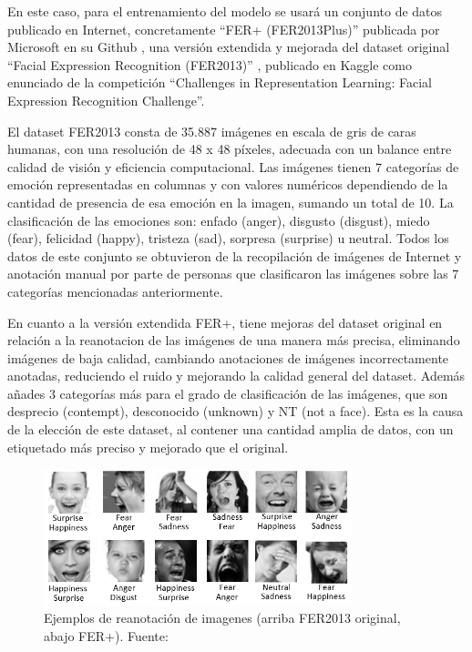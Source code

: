 \documentclass[12pt]{report} %
\begin{document}
En este caso, para el entrenamiento del modelo se usará un conjunto de datos publicado en Internet, concretamente “FER+ (FER2013Plus)” \cite{fer2013Plus} publicada por Microsoft en su Github \cite{fer2013PlusMicrosoft}, una versión extendida y mejorada del dataset original “Facial Expression Recognition (FER2013)” \cite{fer2013}, publicado en Kaggle como enunciado de la competición “Challenges in Representation Learning: Facial Expression Recognition Challenge”.

El dataset FER2013 consta de 35.887 imágenes en escala de gris de caras humanas, con una resolución de 48 x 48 píxeles, adecuada con un balance entre calidad de visión y eficiencia computacional. Las imágenes tienen 7 categorías de emoción representadas en columnas y con valores numéricos dependiendo de la cantidad de presencia de esa emoción en la imagen, sumando un total de 10. La clasificación de las emociones son: enfado (anger), disgusto (disgust), miedo (fear), felicidad (happy), tristeza (sad), sorpresa (surprise) u neutral. Todos los datos de este conjunto se obtuvieron de la recopilación de imágenes de Internet y anotación manual por parte de personas que clasificaron las imágenes sobre las 7 categorías mencionadas anteriormente.

En cuanto a la versión extendida FER+, tiene mejoras del dataset original en relación a la reanotacion de las imágenes de una manera más precisa, eliminando imágenes de baja calidad, cambiando anotaciones de imágenes incorrectamente anotadas, reduciendo el ruido y mejorando la calidad general del dataset. Además añades 3 categorías más para el grado de clasificación de las imágenes, que son desprecio (contempt), desconocido (unknown) y NT (not a face). Esta es la causa de la elección de este dataset, al contener una cantidad amplia de datos, con un etiquetado más preciso y mejorado que el original.

\begin{figure}[H]
	\centering
	\includegraphics[width=0.8\textwidth]{FER+vsFER.png}
	\caption{Ejemplos de reanotación de imagenes (arriba FER2013 original, abajo FER+). Fuente: \cite{fer2013PlusMicrosoft}}
	\label{fig:imagen29}
\end{figure}
\end{document}
